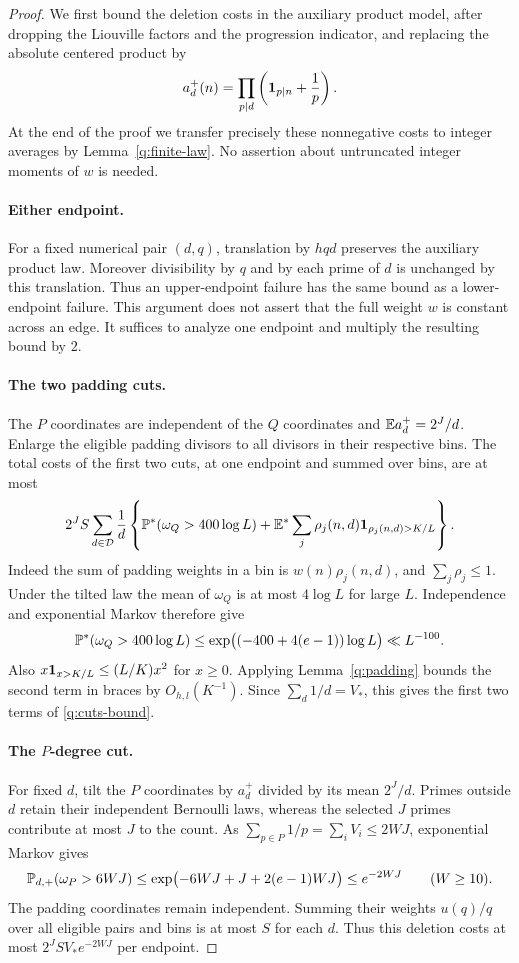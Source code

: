 \begin{proof}
We first bound the deletion costs in the auxiliary product model, after
dropping the Liouville factors and the progression indicator, and replacing
the absolute centered product by
\[
 a_d^+(n)=\prod_{p\mid d}\left(\mathbf 1_{p\mid n}+\frac1p\right).
\]
At the end of the proof we transfer precisely these nonnegative costs
to integer averages by Lemma~\ref{q:finite-law}.  No assertion about
untruncated integer moments of $w$ is needed.

\paragraph{Either endpoint.}
For a fixed numerical pair $(d,q)$, translation by $hqd$ preserves the
auxiliary product law.  Moreover divisibility by $q$ and by each prime
of $d$ is unchanged by this translation.  Thus an upper-endpoint failure
has the same bound as a lower-endpoint failure.  This argument does not
assert that the full weight $w$ is constant across an edge.  It suffices
to analyze one endpoint and multiply the resulting bound by $2$.

\paragraph{The two padding cuts.}
The $P$ coordinates are independent of the $Q$ coordinates and
$\mathbb E a_d^+=2^J/d$.  Enlarge the eligible padding divisors to all divisors
in their respective bins.  The total costs of the first two cuts, at
one endpoint and summed over bins, are at most
\begin{equation}\label{q:padding-deletion}
 2^JS\sum_{d\in\mathcal D}\frac1d
 \left\{\mathbb P^*(\omega_Q>400\log L)
       +\mathbb E^*\sum_j\rho_j(n,d)
                    \mathbf 1_{\rho_j(n,d)>K/L}\right\}.
\end{equation}
Indeed the sum of padding weights in a bin is $w(n)\rho_j(n,d)$,
and $\sum_j\rho_j\le1$.  Under the tilted law the mean of $\omega_Q$
is at most $4\log L$ for large $L$.  Independence and exponential Markov
therefore give
\[
 \mathbb P^*(\omega_Q>400\log L)
 \le\exp\bigl((-400+4(e-1))\log L\bigr)\ll L^{-100}.
\]
Also $x\mathbf 1_{x>K/L}\le(L/K)x^2$ for $x\ge0$.  Applying
Lemma~\ref{q:padding} bounds the second term in braces by
$O_{h,l}(K^{-1})$.  Since $\sum_d1/d=V_*$, this gives the first two
terms of \eqref{q:cuts-bound}.

\paragraph{The $P$-degree cut.}
For fixed $d$, tilt the $P$ coordinates by $a_d^+$ divided by its mean
$2^J/d$.  Primes outside $d$ retain their independent Bernoulli laws,
whereas the selected $J$ primes contribute at most $J$ to the count.
As $\sum_{p\in P}1/p=\sum_iV_i\le2WJ$, exponential Markov gives
\[
 \mathbb P_{d,+}(\omega_P>6WJ)
 \le\exp\bigl(-6WJ+J+2(e-1)WJ\bigr)
 \le e^{-2WJ}\qquad(W\ge10).
\]
The padding coordinates remain independent.  Summing their weights
$u(q)/q$ over all eligible pairs and bins is at most $S$ for each $d$.
Thus this deletion costs at most $2^JSV_*e^{-2WJ}$ per endpoint.


\end{proof}
